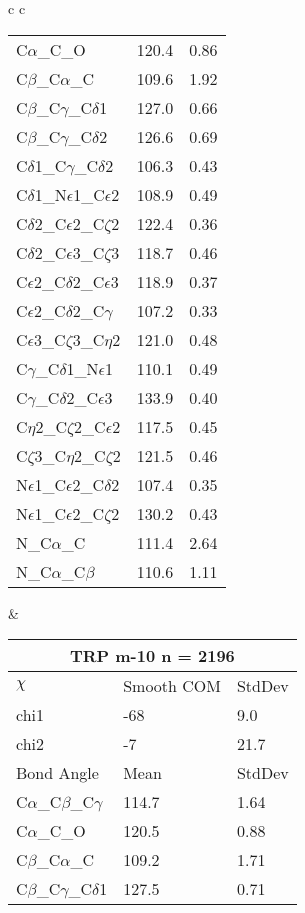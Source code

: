 \begin{longtable}{ c c }
\begin{tabular}{ l l l }
  C$\alpha$\_C\_O & 120.4 & 0.86\\
  C$\beta$\_C$\alpha$\_C & 109.6 & 1.92\\
  C$\beta$\_C$\gamma$\_C$\delta$1 & 127.0 & 0.66\\
  C$\beta$\_C$\gamma$\_C$\delta$2 & 126.6 & 0.69\\
  C$\delta$1\_C$\gamma$\_C$\delta$2 & 106.3 & 0.43\\
  C$\delta$1\_N$\epsilon$1\_C$\epsilon$2 & 108.9 & 0.49\\
  C$\delta$2\_C$\epsilon$2\_C$\zeta$2 & 122.4 & 0.36\\
  C$\delta$2\_C$\epsilon$3\_C$\zeta$3 & 118.7 & 0.46\\
  C$\epsilon$2\_C$\delta$2\_C$\epsilon$3 & 118.9 & 0.37\\
  C$\epsilon$2\_C$\delta$2\_C$\gamma$ & 107.2 & 0.33\\
  C$\epsilon$3\_C$\zeta$3\_C$\eta$2 & 121.0 & 0.48\\
  C$\gamma$\_C$\delta$1\_N$\epsilon$1 & 110.1 & 0.49\\
  C$\gamma$\_C$\delta$2\_C$\epsilon$3 & 133.9 & 0.40\\
  C$\eta$2\_C$\zeta$2\_C$\epsilon$2 & 117.5 & 0.45\\
  C$\zeta$3\_C$\eta$2\_C$\zeta$2 & 121.5 & 0.46\\
  N$\epsilon$1\_C$\epsilon$2\_C$\delta$2 & 107.4 & 0.35\\
  N$\epsilon$1\_C$\epsilon$2\_C$\zeta$2 & 130.2 & 0.43\\
  N\_C$\alpha$\_C & 111.4 & 2.64\\
  N\_C$\alpha$\_C$\beta$ & 110.6 & 1.11\\
  \bottomrule
  \end{tabular}
  &
  \begin{tabular}{ l l l }
  \toprule
  \multicolumn{3}{c}{TRP \textbf{m-10} n = 2196} \\ \toprule
  $\chi$       & Smooth COM & StdDev \\ \midrule
  chi1 & -68 & 9.0 \\ 
  chi2 & -7 & 21.7 \\ \midrule
  Bond Angle   & Mean     & StdDev \\ \midrule
  C$\alpha$\_C$\beta$\_C$\gamma$ & 114.7 & 1.64\\
  C$\alpha$\_C\_O & 120.5 & 0.88\\
  C$\beta$\_C$\alpha$\_C & 109.2 & 1.71\\
  C$\beta$\_C$\gamma$\_C$\delta$1 & 127.5 & 0.71\\

\end{tabular}
\end{longtable}
